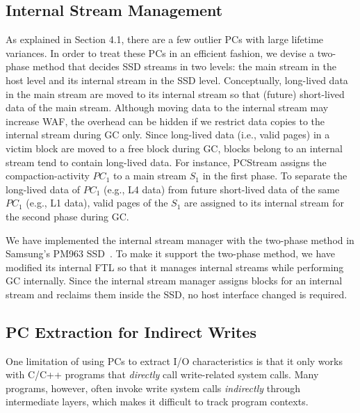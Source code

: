 \subsection{Internal Stream Management}
\vspace{-5pt}
As explained in Section 4.1, there are a few outlier PCs with large lifetime
variances. In order to treat these PCs in an efficient fashion,
we devise a
two-phase method that decides SSD streams in two levels: the main stream in the
host level and its internal stream in the SSD level.  Conceptually, long-lived
data in the main stream are moved to its internal stream so that
(future) short-lived data of the main stream.  Although moving data to the
internal stream may increase WAF, the overhead can be hidden if we restrict
data copies to the internal stream during GC only.  Since long-lived data
(i.e., valid pages) in a victim block are moved to a free block during GC,
blocks belong to an internal stream tend to contain long-lived data.  For
instance, \textsf{\small PCStream} assigns the compaction-activity {\it
$PC_1$} to a main stream {\it $S_1$} in the first phase.  To separate the
long-lived data of {\it $PC_1$} (e.g., L4 data) from future short-lived data of
the same {\it $PC_1$} (e.g., L1 data), valid pages of the {\it $S_1$} are
assigned to its internal stream for the second phase during GC.

We have implemented the internal stream manager with the two-phase method in
Samsung's PM963 SSD~\cite{PM963}. To make it support the two-phase method, we
have modified its internal FTL so that it manages internal streams while
performing GC internally. 
Since the internal stream manager assigns blocks for an internal stream 
and reclaims them inside the SSD, no host interface changed is required.


\vspace{-10pt}
\subsection{PC Extraction for Indirect Writes}
\vspace{-5pt}
One limitation of using PCs to extract I/O characteristics is that it only
works with C/C++ programs that \textit{directly} call write-related system
calls.  Many programs, however, often invoke write system calls
\textit{indirectly} through intermediate layers, which makes it difficult to
track program contexts.

